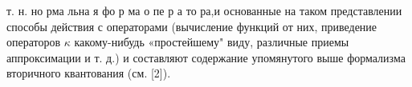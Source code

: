 \documentclass[10pt]{article}
\begin{document}
т. н. но рма льна я фо р ма о пе р а то ра,и основанные на таком представлении способы действия с операторами (вычисление функций от них, приведение операторов $\kappa$ какому-нибудь «простейшему" виду, различные приемы аппроксимации и т. д.) и составляют содержание упомянутого выше формализма вторичного квантования (см. [2]).
\end{document}
